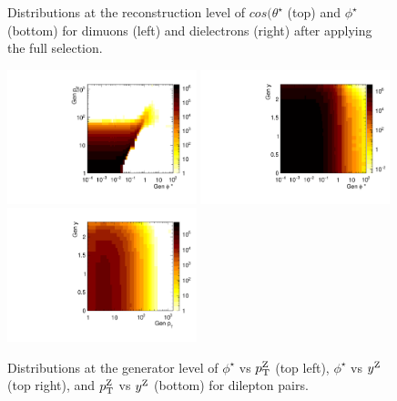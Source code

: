 \begin{figure}
	\caption{Distributions at the reconstruction level of $cos(\theta^\star$ (top) and $\phi^\star$ (bottom) for dimuons 
	(left) and dielectrons (right) after applying the full selection.}
	\label{fig:recodist2}
\end{figure}

\begin{figure}
	\centering
	\includegraphics[width=0.49\textwidth]{figures/zpt/phiVpt.pdf}
	\includegraphics[width=0.49\textwidth]{figures/zpt/phiVrap.pdf}
	\includegraphics[width=0.49\textwidth]{figures/zpt/ptVrap.pdf}
	\caption{Distributions at the generator level of $\phi^\star$ vs $p_{\mathrm{T}}^{\mathrm{Z}}$ (top left), $\phi^\star$ vs $y^{\mathrm{Z}}$ (top right), and $p_{\mathrm{T}}^{\mathrm{Z}}$ vs $y^{\mathrm{Z}}$ (bottom) for dilepton pairs.}
	\label{fig:gendist1}
\end{figure}

